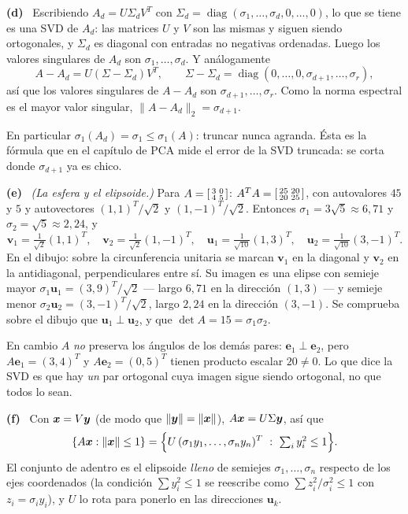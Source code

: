 \documentclass[11pt,a4paper]{article}
\newcommand{\bi}[1]{\boldsymbol{#1}}
\newcommand{\bu}{\bi{u}}  \newcommand{\bv}{\bi{v}}  \newcommand{\bw}{\bi{w}}
\DeclareMathOperator{\diag}{diag}
\newcommand{\itemsol}[1]{\par\medskip\noindent\textbf{(#1)}\ \ignorespaces}
\begin{document}
\itemsol{d} Escribiendo $A_d=U\Sigma_dV^T$ con
$\Sigma_d=\diag(\sigma_1,\dots,\sigma_d,0,\dots,0)$, lo que se tiene es una SVD
de $A_d$: las matrices $U$ y $V$ son las mismas y siguen siendo ortogonales, y
$\Sigma_d$ es diagonal con entradas no negativas ordenadas. Luego los valores
singulares de $A_d$ son $\sigma_1,\dots,\sigma_d$. Y análogamente
\[
A-A_d=U(\Sigma-\Sigma_d)V^{T},\qquad
\Sigma-\Sigma_d=\diag(0,\dots,0,\sigma_{d+1},\dots,\sigma_r),
\]
así que los valores singulares de $A-A_d$ son $\sigma_{d+1},\dots,\sigma_r$. Como
la norma espectral es el mayor valor singular, $\|A-A_d\|_2=\sigma_{d+1}$.

En particular $\sigma_1(A_d)=\sigma_1\le\sigma_1(A)$: truncar nunca agranda. Ésta
es la fórmula que en el capítulo de PCA mide el error de la SVD truncada: se
corta donde $\sigma_{d+1}$ ya es chico.

\itemsol{e} \emph{(La esfera y el elipsoide.)} Para
$A=\begin{bsmallmatrix}3&0\\4&5\end{bsmallmatrix}$:
$A^TA=\begin{bsmallmatrix}25&20\\20&25\end{bsmallmatrix}$, con autovalores $45$ y
$5$ y autovectores $(1,1)^T/\sqrt2$ y $(1,-1)^T/\sqrt2$. Entonces
$\sigma_1=3\sqrt5\approx6{,}71$ y $\sigma_2=\sqrt5\approx2{,}24$, y
\[
\bv_1=\tfrac{1}{\sqrt2}(1,1)^T,\quad
\bv_2=\tfrac{1}{\sqrt2}(1,-1)^T,\quad
\bu_1=\tfrac{1}{\sqrt{10}}(1,3)^T,\quad
\bu_2=\tfrac{1}{\sqrt{10}}(3,-1)^T .
\]
En el dibujo: sobre la circunferencia unitaria se marcan $\bv_1$ en la diagonal y
$\bv_2$ en la antidiagonal, perpendiculares entre sí. Su imagen es una elipse con
semieje mayor $\sigma_1\bu_1=(3,9)^T/\sqrt2$ --- largo $6{,}71$ en la dirección
$(1,3)$ --- y semieje menor $\sigma_2\bu_2=(3,-1)^T/\sqrt2$, largo $2{,}24$ en la
dirección $(3,-1)$. Se comprueba sobre el dibujo que $\bu_1\perp\bu_2$, y que
$\det A=15=\sigma_1\sigma_2$.

En cambio $A$ \emph{no} preserva los ángulos de los demás pares:
$\bi{e}_1\perp\bi{e}_2$, pero $A\bi{e}_1=(3,4)^T$ y $A\bi{e}_2=(0,5)^T$ tienen
producto escalar $20\neq0$. Lo que dice la SVD es que hay \emph{un} par ortogonal
cuya imagen sigue siendo ortogonal, no que todos lo sean.

\itemsol{f} Con $\bx=V\by$ (de modo que $\|\by\|=\|\bx\|$), $A\bx=U\Sigma\by$,
así que
\[
\{A\bx:\|\bx\|\le1\}
=\Big\{U\,(\sigma_1y_1,\dots,\sigma_ny_n)^T\ :\ \textstyle\sum_i y_i^{2}\le1\Big\}.
\]
El conjunto de adentro es el elipsoide \emph{lleno} de semiejes
$\sigma_1,\dots,\sigma_n$ respecto de los ejes coordenados (la condición
$\sum y_i^2\le1$ se reescribe como $\sum z_i^2/\sigma_i^2\le1$ con
$z_i=\sigma_iy_i$), y $U$ lo rota para ponerlo en las direcciones $\bu_k$.
\end{document}
